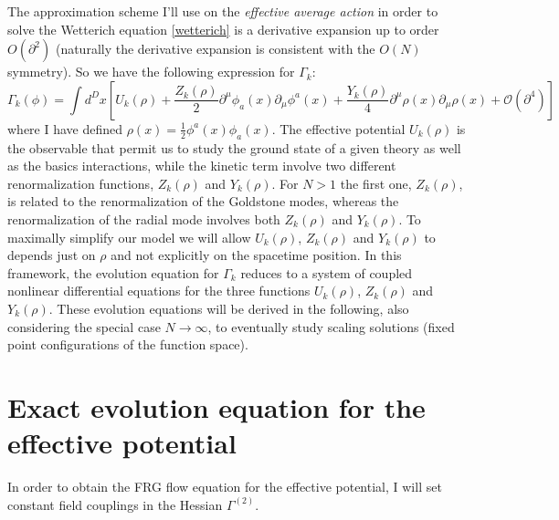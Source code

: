 The approximation scheme I'll use on the \emph{effective average action} in order to solve the Wetterich equation
\eqref{wetterich} is a derivative expansion up to order $O(\partial^2)$ (naturally the derivative expansion is consistent with the $O(N)$ symmetry).
So we have the following expression for $\Gamma_k$:
\begin{equation}\label{azioneefficace}
 \Gamma_k (\phi) = \int d^Dx \left[  U_k(\rho) + \frac{Z_k(\rho)}{2} \partial^\mu \phi_a(x) \partial_\mu \phi^a(x) + \frac{Y_k(\rho)}{4} \partial^\mu \rho(x) \partial_\mu \rho(x) + \mathcal{O}(\partial^4)\right]
\end{equation}
where I have defined $\rho(x) = \frac{1}{2}\phi^a(x)\phi_a(x)$.
The effective potential $U_k(\rho)$ is the observable that permit us to study the ground state of a given theory as well as the basics interactions, while the kinetic term involve two different renormalization functions, $Z_k(\rho)$ and $Y_k(\rho)$.
For $N > 1$ the first one, $Z_k(\rho)$, is related to the renormalization of the Goldstone modes, whereas the renormalization of the radial mode involves both $Z_k(\rho)$ and $Y_k(\rho)$.
To maximally simplify our model we will allow $U_k(\rho)$, $Z_k(\rho)$ and $Y_k(\rho)$ to depends just on $\rho$ and not explicitly on the spacetime position.
In this framework, the evolution equation for $\Gamma_k$ reduces to a system of coupled nonlinear differential equations for the three functions $U_k(\rho)$, $Z_k(\rho)$ and $Y_k(\rho)$.
These evolution equations will be derived in the following, also considering the special case $N\to \infty$,
to eventually study scaling solutions (fixed point configurations of the function space). 


\section{Exact evolution equation for the effective potential}
In order to obtain the FRG flow equation for the effective potential, I will set constant field couplings in the Hessian $\Gamma^{(2)}$.

